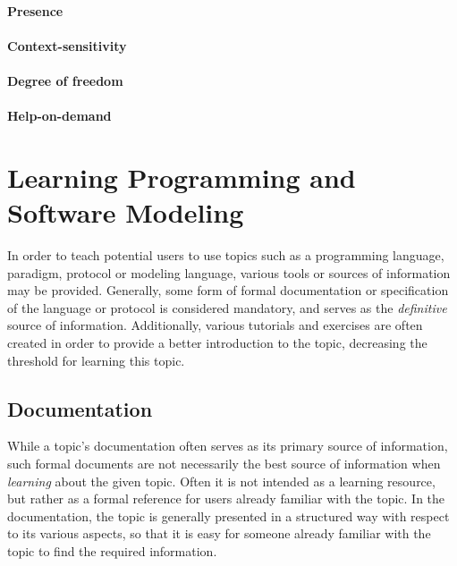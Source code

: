\paragraph{Presence} 

\paragraph{Context-sensitivity}

\paragraph{Degree of freedom}

\paragraph{Help-on-demand}
 




\section{Learning Programming and Software Modeling}
\label{sec:learning_programming}
In order to teach potential users to use topics such as a programming language, paradigm, protocol or modeling language, various tools or sources of information may be provided. Generally, some form of formal documentation or specification of the language or protocol is considered mandatory, and serves as the \emph{definitive} source of information. Additionally, various tutorials and exercises are often created in order to provide a better introduction to the topic, decreasing the threshold for learning this topic.

\subsection{Documentation}
While a topic's documentation often serves as its primary source of information, such formal documents are not necessarily the best source of information when \emph{learning} about the given topic. Often it is not intended as a learning resource, but rather as a formal reference for users already familiar with the topic. In the documentation, the topic is generally presented in a structured way with respect to its various aspects, so that it is easy for someone already familiar with the topic to find the required information.

